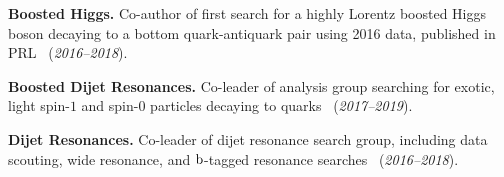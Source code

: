 \documentclass[12pt]{res}
\begin{document}
\begin{resume}
\textbf{Boosted Higgs.} Co-author of first search for a highly Lorentz boosted Higgs boson
  decaying to a bottom quark-antiquark pair using 2016 data, published in
  PRL~\cite{Sirunyan:2017dgc} (\textit{2016--2018}).

\textbf{Boosted Dijet Resonances.} Co-leader of analysis group searching for exotic, light spin-$1$ and
  spin-$0$ particles decaying to
  quarks~\cite{Sirunyan:2017nvi,Sirunyan:2018ikr,Sirunyan:2019sgo,Sirunyan:2019vxa} (\textit{2017--2019}).

\textbf{Dijet Resonances.} Co-leader of dijet resonance search group, including data scouting, wide resonance, and $\mathrm{b}$-tagged resonance searches~\cite{Sirunyan:2016iap,Sirunyan:2018xlo,CMS-PAS-EXO-17-026,Duarte:2018bsd,Sirunyan:2019vgj,Sirunyan:2019pnb} (\textit{2016--2018}).


\end{resume}
\end{document}
